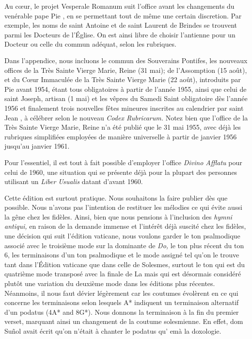 \begin{frpars}

Au cœur, le projet Vesperale Romanum suit l'office avant les changements du venérable pape Pie , en se permettant tout de même une certain discretion. Par exemple, les noms de saint Antoine et de saint Laurent de Brindes se trouvent parmi les Docteurs de l'Église. On est ainsi libre de choisir l'antienne pour un Docteur ou celle du commun adéquat, selon les rubriques.

Dans l'appendice, nous incluons le commun des Souverains Pontifes, les nouveaux offices de la Très Sainte Vierge Marie, Reine (31 mai); de l'Assomption (15 août), et du Cœur Immaculée de la Très Sainte Vierge Marie (22 août), introduits par Pie  avant 1954, étant tous obligatoires à partir de l'année 1955, ainsi que celui de saint Joseph, artisan (1 mai) et les vêpres du Samedi Saint obligatoire dès l'année 1956 et finalement trois nouvelles fêtes mineures inscrites au calendrier par saint Jean , à célébrer selon le nouveau \textit{Codex Rubricarum.} Notez bien que l'office de la Très Sainte Vierge Marie, Reine n'a été publié que le 31 mai 1955, avec déjà les rubriques simplifiées employées de manière universelle à partir de janvier 1956 jusqu'au janvier 1961.

Pour l'essentiel, il est tout à fait possible d'employer l'office \textit{Divino Afflatu} pour celui de 1960, une situation qui se présente déjà pour la plupart des personnes utilisant un \textit{Liber Usualis} datant d'avant 1960.

Cette édition est surtout pratique. Nous souhaitons la faire publier dès que possible. Nous n'avons pas l'intention de restituer les mélodies ce qui évite aussi la gêne chez les fidèles. Ainsi, bien que nous pensions à l'inclusion des \textit{hymni antiqui,} en raison de la demande immense et l'intérêt déjà suscité chez les fidèles, une décision qui suit l'édition vaticane, nous voulons garder le ton psalmodique associé avec le troisième mode sur la dominante de \textit{Do,} le ton plus récent du ton 6, les terminaisons d'un ton psalmodique et le mode assigné tel qu'on le trouve tant dans l'Édition vaticane que dans celle de Solesmes, surtout le ton qui est du quatrième mode transposé avec la finale de La mais qui est désormais considéré plutôt une variation du deuxième mode dans les éditions plus récentes. Néanmoins, il nous faut dévier légèrement car les coutumes évolèrent en ce qui concerne les terminaisons selon lesquels A* indiquent un terminaison alternatif d'un podatus  (4A* and 8G*). Nous donnons la terminaison à la fin du premier verset, marquant ainsi un changement de la coutume solesmienne. En effet, dom Suñol avait écrit qu'on n'était à chanter le podatus qu' emà la doxologie.


\end{frpars}
